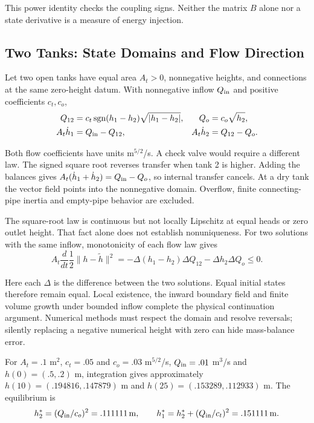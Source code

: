 This power identity checks the coupling signs. Neither the matrix $B$ alone nor a state derivative is a measure of energy injection.

\subsection{Two Tanks: State Domains and Flow Direction}
\label{ex:two_tank}
\label{ex:twotank_state}

Let two open tanks have equal area $A_t>0$, nonnegative heights, and connections at the same zero-height datum. With nonnegative inflow $Q_{\rm in}$ and positive coefficients $c_t,c_o$,
\begin{equation}
\label{eq:tank_model}
 \begin{aligned}
 Q_{12}&=c_t\operatorname{sgn}(h_1-h_2)\sqrt{|h_1-h_2|},
 &Q_o&=c_o\sqrt{h_2},\\
 A_t\dot h_1&=Q_{\rm in}-Q_{12},
 &A_t\dot h_2&=Q_{12}-Q_o.
 \end{aligned}
\end{equation}

Both flow coefficients have units m$^{5/2}$/s. A check valve would require a different law. The signed square root reverses transfer when tank 2 is higher. Adding the balances gives $A_t(\dot h_1+\dot h_2)=Q_{\rm in}-Q_o$, so internal transfer cancels. At a dry tank the vector field points into the nonnegative domain. Overflow, finite connecting-pipe inertia and empty-pipe behavior are excluded.

The square-root law is continuous but not locally Lipschitz at equal heads or zero outlet height. That fact alone does not establish nonuniqueness. For two solutions with the same inflow, monotonicity of each flow law gives
\begin{equation}
\label{eq:tank_uniqueness}
 A_t\frac{d}{dt}\frac12\|h-\tilde h\|^2
 =-\Delta(h_1-h_2)\Delta Q_{12}-\Delta h_2\Delta Q_o\leq0.
\end{equation}

Here each $\Delta$ is the difference between the two solutions. Equal initial states therefore remain equal. Local existence, the inward boundary field and finite volume growth under bounded inflow complete the physical continuation argument. Numerical methods must respect the domain and resolve reversals; silently replacing a negative numerical height with zero can hide mass-balance error.

For $A_t=.1$ m$^2$, $c_t=.05$ and $c_o=.03$ m$^{5/2}$/s, $Q_{\rm in}=.01$ m$^3$/s and $h(0)=(.5,.2)$ m, integration gives approximately $h(10)=(.194816,.147879)$ m and $h(25)=(.153289,.112933)$ m. The equilibrium is
\begin{equation}
\label{eq:tank_equilibrium}
 h_2^*=(Q_{\rm in}/c_o)^2=.111111\,\mathrm{m},\qquad
 h_1^*=h_2^*+(Q_{\rm in}/c_t)^2=.151111\,\mathrm{m}.
\end{equation}

